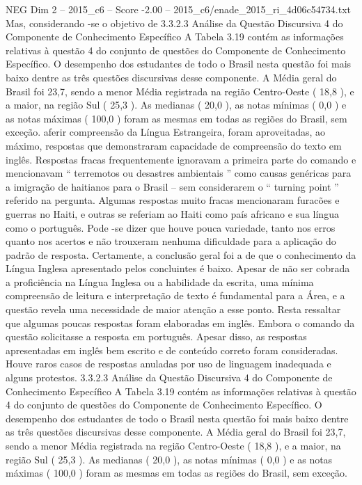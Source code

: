 \begin{textsample}{NEG Dim 2 – 2015\_c6 – Score -2.00 – 2015\_c6/enade\_2015\_ri\_4d06c54734.txt}
Mas, considerando -se o objetivo de 3.3.2.3 Análise da Questão Discursiva 4 do Componente de Conhecimento Específico A Tabela 3.19 contém as informações relativas à questão 4 do conjunto de questões do Componente de Conhecimento Específico.
O desempenho dos estudantes de todo o Brasil nesta questão foi mais baixo dentre as três questões discursivas desse componente.
A Média geral do Brasil foi 23,7, sendo a menor Média registrada na região Centro-Oeste ( 18,8 ), e a maior, na região Sul ( 25,3 ).
As medianas ( 20,0 ), as notas mínimas ( 0,0 ) e as notas máximas ( 100,0 ) foram as mesmas em todas as regiões do Brasil, sem exceção. aferir compreensão da Língua Estrangeira, foram aproveitadas, ao máximo, respostas que demonstraram capacidade de compreensão do texto em inglês.
Respostas fracas frequentemente ignoravam a primeira parte do comando e mencionavam “ terremotos ou desastres ambientais ” como causas genéricas para a imigração de haitianos para o Brasil – sem considerarem o “ turning point ” referido na pergunta.
Algumas respostas muito fracas mencionaram furacões e guerras no Haiti, e outras se referiam ao Haiti como país africano e sua língua como o português.
Pode -se dizer que houve pouca variedade, tanto nos erros quanto nos acertos e não trouxeram nenhuma dificuldade para a aplicação do padrão de resposta.
Certamente, a conclusão geral foi a de que o conhecimento da Língua Inglesa apresentado pelos concluintes é baixo.
Apesar de não ser cobrada a proficiência na Língua Inglesa ou a habilidade da escrita, uma mínima compreensão de leitura e interpretação de texto é fundamental para a Área, e a questão revela uma necessidade de maior atenção a esse ponto.
Resta ressaltar que algumas poucas respostas foram elaboradas em inglês.
Embora o comando da questão solicitasse a resposta em português.
Apesar disso, as respostas apresentadas em inglês bem escrito e de conteúdo correto foram consideradas.
Houve raros casos de respostas anuladas por uso de linguagem inadequada e alguns protestos. 3.3.2.3 Análise da Questão Discursiva 4 do Componente de Conhecimento Específico A Tabela 3.19 contém as informações relativas à questão 4 do conjunto de questões do Componente de Conhecimento Específico.
O desempenho dos estudantes de todo o Brasil nesta questão foi mais baixo dentre as três questões discursivas desse componente.
A Média geral do Brasil foi 23,7, sendo a menor Média registrada na região Centro-Oeste ( 18,8 ), e a maior, na região Sul ( 25,3 ).
As medianas ( 20,0 ), as notas mínimas ( 0,0 ) e as notas máximas ( 100,0 ) foram as mesmas em todas as regiões do Brasil, sem exceção.

\end{textsample}
